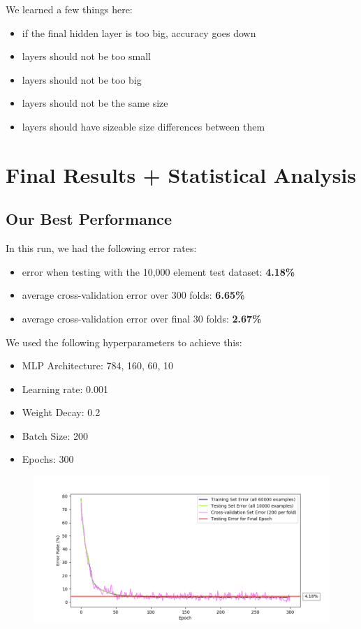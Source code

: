 \documentclass[11pt]{article}
\makeatletter
\def\maxwidth{\ifdim\Gin@nat@width>\linewidth\linewidth
    \else\Gin@nat@width\fi}
\let\Oldincludegraphics\includegraphics
\renewcommand{\includegraphics}[1]{\Oldincludegraphics[width=.8\maxwidth]{#1}}
\makeatother
\begin{document}
We learned a few things here:
\begin{itemize}
	\item if the final hidden layer is too big,
accuracy goes down
	\item layers should not be too small
	\item layers should not be too big
	\item layers should not be the same size
	\item layers should have sizeable size differences between them
\end{itemize}

\pagebreak

    \section{Final Results + Statistical
Analysis}\label{final-results-our-best-performance-statistical-analysis}

\subsection{Our Best Performance}

In this run, we had the following error rates:
\begin{itemize}
	\item error when testing with the 10,000 element test dataset: \textbf{4.18\%}
	\item average cross-validation error over 300 folds: \textbf{6.65\%}
	\item average cross-validation error over final 30 folds: \textbf{2.67\%}
\end{itemize} 


\hspace{-16px}We used the following hyperparameters to achieve this:
\begin{itemize}
	\item MLP Architecture: 784, 160, 60, 10
	\item Learning rate: 0.001
	\item Weight Decay:	0.2
	\item Batch Size: 200
	\item Epochs: 300
\end{itemize}


\begin{figure}[htbp]
\centering
\includegraphics{plots/ff-bestest-performance-wide.png}
\end{figure}
\end{document}
